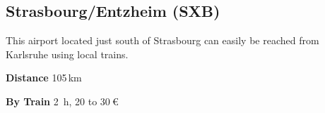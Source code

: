 \begin{multicols}{2}
\subsection{Strasbourg/Entzheim (SXB)}

This airport located just south of Strasbourg can easily be reached from Karlsruhe
using local trains.

\begin{labeling}{\hspace*{10ex}}
  \item[\bf Distance] 105\,km
  \item[\bf By Train] \SI{2}{\hour}, 20 to $\SI{30}{\euro}$
\end{labeling}

\end{multicols}

